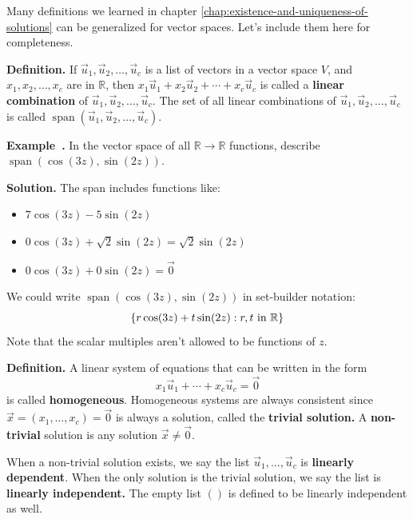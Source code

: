 \documentclass[11pt, letterpaper]{report}
\newenvironment{notes}{}{}
\newenvironment{book}{}{}
\let\originalleft\left
\let\originalright\right
\renewcommand{\left}{\mathopen{}\mathclose\bgroup\originalleft}
\renewcommand{\right}{\aftergroup\egroup\originalright}
\newcounter{example}[section]
\newcommand{\example}{\refstepcounter{example}%
\par\noindent\textbf{Example~\theexample.} }
\newenvironment{definition}{\begin{bbox}\par\noindent\textbf{Definition. }}
  {\end{bbox}}
\newlength\oldfboxsep%
\newlength\myminiwidth%
\newenvironment{bbox}{%
  \setlength\oldfboxsep\fboxsep
  \setlength{\fboxsep}{.1in}%
  \setlength\myminiwidth\linewidth%
  \addtolength\myminiwidth{-0.2in}%
  \vspace{0.1in}%
  \begin{lrbox}{\bboxbox}\begin{minipage}{\myminiwidth}%
    }{%
    \end{minipage}\end{lrbox}%
  \noindent\fbox{\usebox{\bboxbox}}\vspace{0.1in}\setlength\fboxsep\oldfboxsep%
}
\newcommand{\R}{\mathbb{R}}
\DeclareMathOperator{\spn}{span}
\begin{document}
\begin{notes}
\end{notes}

Many definitions we learned in chapter \ref{chap:existence-and-uniqueness-of-solutions} can be generalized for vector spaces. Let's include them here for completeness.

\begin{definition}  If $\vec{u}_1,\vec{u}_2,\ldots, \vec{u}_c$ is a list of vectors in a vector space $V$, and $x_1,x_2,\ldots,x_c$ are in $\R$, then $x_1\vec{u}_1+x_2\vec{u}_2+\cdots+x_c\vec{u}_c$ is called a \textbf{linear combination} of $\vec{u}_1,\vec{u}_2,\ldots, \vec{u}_c$. The set of all linear combinations of $\vec{u}_1,\vec{u}_2,\ldots, \vec{u}_c$ is called $\spn ( \vec{u}_1,\vec{u}_2,\ldots,\vec{u}_c )$.
\end{definition}

\example In the vector space of all $\R\rightarrow\R$ functions, describe $\spn(\cos(3z),\sin(2z))$.

\begin{notes}
\vfill
\newpage
\end{notes}

\begin{book}
\textbf{Solution.} The span includes functions like:
\begin{itemize}
\item $7\cos(3z) - 5\sin(2z)$
\item $0\cos(3z) + \sqrt{2}\sin(2z) = \sqrt{2}\sin(2z)$
\item $0\cos(3z) + 0\sin(2z) = \vec{0}$
\end{itemize}
We could write $\spn ( \cos(3z),\sin(2z) )$ in set-builder notation: 
\[\left\{ r\cos(3z) + t\sin(2z) : r,t \text{ in } \R\right\}\]
Note that the scalar multiples aren't allowed to be functions of $z$. \blacksquare
\end{book}

\begin{definition}   
A linear system of equations that can be written in the form 
\[ x_1 \vec{u}_1 + \cdots + x_c\vec{u}_c = \vec{0}\]
is called \textbf{homogeneous}. Homogeneous systems are always consistent since $\vec{x} = ( x_1, \ldots, x_c )=\vec{0}$ is always a solution, called the \textbf{trivial solution.} A \textbf{non-trivial} solution is any solution $\vec{x} \ne \vec{0}$. 

When a non-trivial solution exists, we say the list $\vec{u}_1, \ldots, \vec{u}_c$ is \textbf{linearly dependent}. When the only solution is the trivial solution, we say the list is \textbf{linearly independent.} The empty list $()$ is defined to be linearly independent as well.
\end{definition}
\end{document}

